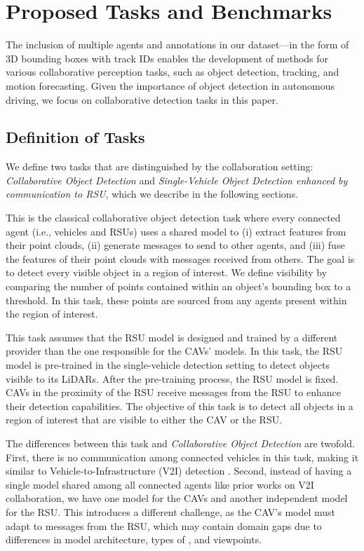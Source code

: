 \section{Proposed Tasks and Benchmarks}


The inclusion of multiple agents and annotations in our dataset—in the form of 3D bounding boxes with track IDs enables the development of methods for various collaborative perception tasks, such as object detection, tracking, and motion forecasting. Given the importance of object detection in autonomous driving, we focus on collaborative detection tasks in this paper.

\subsection{Definition of Tasks}
We define two tasks that are distinguished by the collaboration setting: \textit{Collaborative Object Detection} and \textit{Single-Vehicle Object Detection enhanced by communication to RSU}, which we describe in the following sections.

This is the classical collaborative object detection task \cite{wang2020v2vnet, li2021learning} where every connected agent (i.e., vehicles and RSUs) uses a shared model to (i) extract features from their point clouds, (ii) generate messages to send to other agents, and (iii) fuse the features of their point clouds with messages received from others.
The goal is to detect every visible object in a region of interest. 
We define visibility by comparing the number of \lidar points contained within an object's bounding box to a threshold. In this task, these \lidar points are sourced from any agents present within the region of interest.


This task assumes that the RSU model is designed and trained by a different provider than the one responsible for the CAVs' models.
In this task, the RSU model is pre-trained in the single-vehicle detection setting to detect objects visible to its LiDARs. After the pre-training process, the RSU model is fixed. CAVs in the proximity of the RSU receive messages from the RSU to enhance their detection capabilities. The objective of this task is to detect all objects in a region of interest that are visible to either the CAV or the RSU.

The differences between this task and \textit{Collaborative Object Detection} are twofold. 
First, there is no communication among connected vehicles in this task, making it similar to Vehicle-to-Infrastructure (V2I) detection \cite{yu2022dair, zimmer2024tumtraf,xiang2024v2x}. 
Second, instead of having a single model shared among all connected agents like prior works on V2I collaboration, we have one model for the CAVs and another independent model for the RSU. 
This introduces a different challenge, as the CAV's model must adapt to messages from the RSU, which may contain domain gaps due to differences in model architecture, types of \lidar, and viewpoints.

